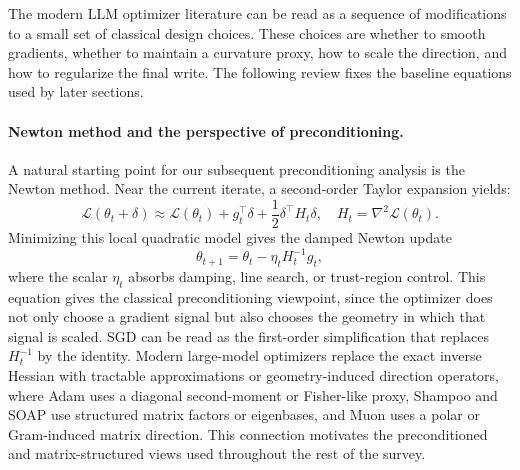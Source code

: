The modern LLM optimizer literature can be read as a sequence of modifications
to a small set of classical design choices.  These choices are whether to
smooth gradients, whether to maintain a curvature proxy, how to scale the
direction, and how to regularize the final write.  The following review fixes the baseline equations
used by later sections.


\paragraph{Newton method and the perspective of preconditioning.}
A natural starting point for our subsequent preconditioning analysis is the Newton method. Near the current iterate, a second-order Taylor expansion yields:
\begin{equation}
  \mathcal{L}(\theta_t+\delta)
  \approx
  \mathcal{L}(\theta_t)
  + g_t^\top\delta
  + \frac{1}{2}\delta^\top H_t\delta,
  \quad
  H_t=\nabla^2\mathcal{L}(\theta_t).
  \label{eq:newton-quadratic}
\end{equation}
Minimizing this local quadratic model gives the damped Newton update
\begin{equation}
  \theta_{t+1}
  = \theta_t - \eta_t H_t^{-1}g_t,
  \label{eq:newton-update}
\end{equation}
where the scalar $\eta_t$ absorbs damping, line search, or trust-region control.  This equation gives the classical preconditioning viewpoint, since the optimizer does not only choose a gradient signal but also chooses the geometry in which that signal is scaled.  SGD can be read as the first-order simplification that replaces $H_t^{-1}$ by the identity.  Modern large-model optimizers replace the exact inverse Hessian with tractable approximations or geometry-induced direction operators, where Adam uses a diagonal second-moment or Fisher-like proxy, Shampoo and SOAP use structured matrix factors or eigenbases, and Muon uses a polar or Gram-induced matrix direction.  This connection motivates the preconditioned and matrix-structured views used throughout the rest of the survey.

